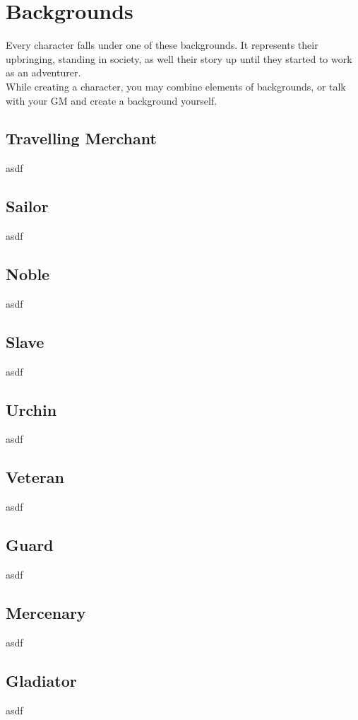 \chapter{Backgrounds}
Every character falls under one of these backgrounds.
It represents their upbringing, standing in society, as well their story up until they started to work as an adventurer. \\
While creating a character, you may combine elements of backgrounds, or talk with your GM and create a background yourself.\\

\section{Travelling Merchant}
asdf

\section{Sailor}
asdf

\section{Noble}
asdf

\section{Slave}
asdf

\section{Urchin}
asdf

\section{Veteran}
asdf

\section{Guard}
asdf

\section{Mercenary}
asdf

\section{Gladiator}
asdf

